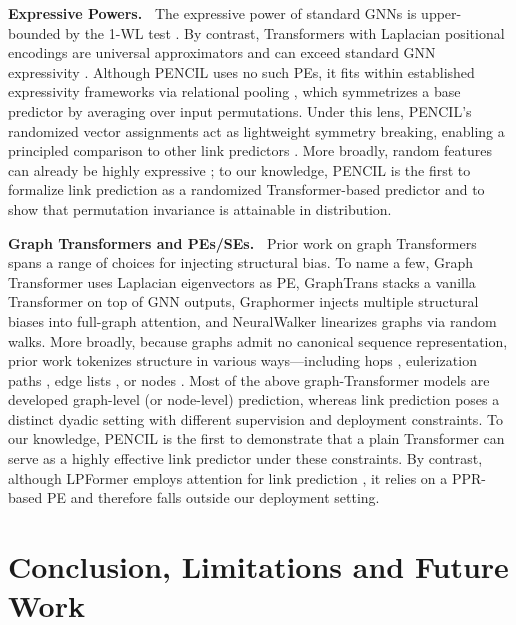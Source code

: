 \documentclass{article}
\theoremstyle{plain}
\theoremstyle{definition}
\theoremstyle{remark}
\begin{document}
\textbf{Expressive Powers.~} The expressive power of standard GNNs is upper-bounded by the 1-WL test \cite{xu2018how}. By contrast, Transformers with Laplacian positional encodings are universal approximators and can exceed standard GNN expressivity \cite{kreuzer2021rethinking}. Although PENCIL uses no such PEs, it fits within established expressivity frameworks via relational pooling \cite{murphy_relational_2019,chen_can_2020,zhou_relational_2023}, which symmetrizes a base predictor by averaging over input permutations. Under this lens, PENCIL's randomized vector assignments act as lightweight symmetry breaking, enabling a principled comparison to other link predictors \cite{lachi2025bridgingtheorypracticelink}. More broadly, random features can already be highly expressive \cite{sato_random_features_2021,abboud_surprising_2021}; to our knowledge, PENCIL is the first to formalize link prediction as a randomized Transformer-based predictor and to show that permutation invariance is attainable in distribution.

\textbf{Graph Transformers and PEs/SEs.~}
Prior work on graph Transformers spans a range of choices for injecting structural bias. To name a few, Graph Transformer \cite{dwivedi2021generalization} uses Laplacian eigenvectors as PE, GraphTrans \cite{jain2021representing} stacks a vanilla Transformer on top of GNN outputs, Graphormer \cite{ying_do_transformers_2021} injects multiple structural biases into full-graph attention, and NeuralWalker \cite{chen2025learning} linearizes graphs via random walks. More broadly, because graphs admit no canonical sequence representation, prior work tokenizes structure in various ways---including hops \cite{chen_nagphormer_2023}, eulerization paths \cite{zhao_graphgpt_2025}, edge lists \cite{kim_pure_2022,sanford_understanding_2024}, or nodes \cite{dwivedi_graph_2023,yehudai_depth-width_2025,jain2021representing}. Most of the above graph-Transformer models are developed graph-level (or node-level) prediction, whereas link prediction poses a distinct dyadic setting with different supervision and deployment constraints. To our knowledge, PENCIL is the first to demonstrate that a plain Transformer can serve as a highly effective link predictor under these constraints. By contrast, although LPFormer employs attention for link prediction \cite{shomer_lpformer_2024}, it relies on a PPR-based PE and therefore falls outside our deployment setting.


\section{Conclusion, Limitations and Future Work} 
\end{document}
